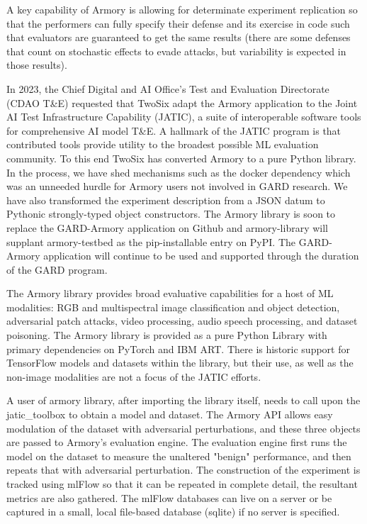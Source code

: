 \documentclass[letterpaper]{article}
\begin{document}
A key capability of Armory is allowing for determinate experiment replication so
that the performers can fully specify their defense and its exercise in code such that
evaluators are guaranteed to get the same results (there are some defenses that count on
stochastic effects to evade attacks, but variability is expected in those results).

In 2023, the Chief Digital and AI Office's Test and Evaluation Directorate (CDAO T\&E)
requested that TwoSix adapt the Armory application to the Joint AI Test Infrastructure
Capability (JATIC), a suite of interoperable software tools for comprehensive AI model
T\&E. A hallmark of the JATIC program is that contributed tools provide utility to the
broadest possible ML evaluation community. To this end TwoSix has converted Armory to a
pure Python library. In the process, we have shed mechanisms such as the docker
dependency which was an unneeded hurdle for Armory users not involved in GARD research.
We have also transformed the experiment description from a JSON datum to Pythonic
strongly-typed object constructors. The Armory library is soon to replace the
GARD-Armory application on Github and armory-library will supplant armory-testbed as the
pip-installable entry on PyPI. The GARD-Armory application will continue to be used and
supported through the duration of the GARD program.


The Armory library provides broad evaluative capabilities for a host of ML modalities:
RGB and multispectral image classification and object detection, adversarial patch
attacks, video processing, audio speech processing, and dataset poisoning. The Armory
library is provided as a pure Python Library with primary dependencies on PyTorch
and IBM ART. There is historic support for TensorFlow models and datasets within
the library, but their use, as well as the non-image modalities
are not a focus of the JATIC efforts.

A user of armory library, after importing the library itself, needs to call
upon the jatic\_toolbox to obtain a model and dataset. The Armory API allows easy
modulation of the dataset with adversarial perturbations, and these three objects
are passed to Armory's evaluation engine. The evaluation engine first runs the
model on the dataset to measure the unaltered "benign" performance, and then
repeats that with adversarial perturbation. The construction of the experiment
is tracked using mlFlow so that it can be repeated in complete detail, the resultant
metrics are also gathered. The mlFlow databases can live on a server or
be captured in a small, local file-based database (sqlite) if no server is specified.
\end{document}
